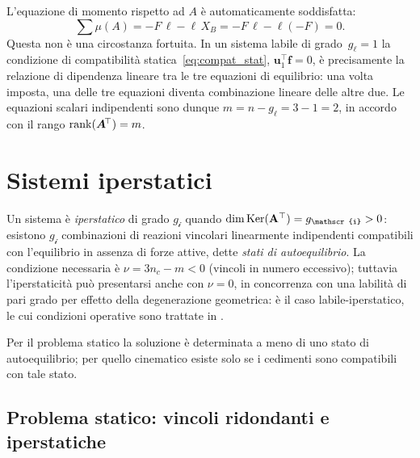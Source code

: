 \begin{esempio}
\begin{svolgimento}
		L'equazione di momento rispetto ad $A$ è automaticamente
		soddisfatta:
		\begin{equation*}
			\sum \mu(A) = -F\,\ell - \ell\,X_B
			= -F\,\ell - \ell(-F) = 0.
		\end{equation*}
		Questa non è una circostanza fortuita. In un sistema labile
		di grado~$g_\ell = 1$ la condizione di compatibilità
		statica~\eqref{eq:compat_stat}, $\bm{u}_1^{\!\top}\bm{f} = 0$,
		è precisamente la relazione di dipendenza lineare tra le tre
		equazioni di equilibrio: una volta imposta, una delle tre
		equazioni diventa combinazione lineare delle altre due. Le
		equazioni scalari indipendenti sono dunque
		$m = n - g_\ell = 3 - 1 = 2$, in accordo con il rango
		$\operatorname{rank}(\bm{A}^{\!\top}) = m$.
	\end{svolgimento}
\end{esempio}


\section{Sistemi iperstatici}\label{sec:iperstatico}

Un sistema è \emph{iperstatico} di grado $g_{\mathscr{i}}$ quando
$\dim\Ker(\Abb^{\top}) = g_{\mathscr{i}} > 0$: esistono
$g_{\mathscr{i}}$ combinazioni di reazioni vincolari linearmente
indipendenti compatibili con l'equilibrio in assenza di forze
attive, dette \emph{stati di autoequilibrio}. La condizione
necessaria è $\nu = 3n_c - m < 0$ (vincoli in numero eccessivo);
tuttavia l'iperstaticità può presentarsi anche con $\nu = 0$,
in concorrenza con una labilità di pari grado per effetto della
degenerazione geometrica: è il caso labile-iperstatico, le cui
condizioni operative sono trattate in .

Per il problema statico la soluzione è determinata a meno di uno
stato di autoequilibrio; per quello cinematico esiste solo se i
cedimenti sono compatibili con tale stato.


\subsection{Problema statico: vincoli ridondanti e iperstatiche}
\label{sec:iperstatico_stat}

